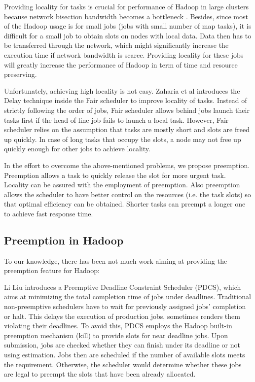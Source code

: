 \documentclass[runningheads,a4paper]{llncs}
\begin{document}
Providing locality for tasks is crucial for performance of Hadoop in large clusters because network bisection bandwidth becomes a bottleneck \cite{dean2008mapreduce}. Besides, since most of the Hadoop usage is for small jobs (jobs with small number of map tasks), it is difficult for a small job to obtain slots on nodes with local data. Data then has to be transferred through the network, which might significantly increase the execution time if network bandwidth is scarce. Providing locality for these jobs will greatly increase the performance of Hadoop in term of time and resource preserving.

Unfortunately, achieving high locality is not easy. Zaharia et al \cite{zaharia2010delay} introduces the Delay technique inside the Fair scheduler to improve locality of tasks. Instead of strictly following the order of jobs, Fair scheduler allows behind jobs launch their tasks first if the head-of-line job fails to launch a local task. However, Fair scheduler relies on the assumption that tasks are mostly short and slots are freed up quickly. In case of long tasks that occupy the slots, a node may not free up quickly enough for other jobs to achieve locality.

In the effort to overcome the above-mentioned problems, we propose preemption. Preemption allows a task to quickly release the slot for more urgent task. Locality can be assured with the employment of preemption. Also preemption allows the scheduler to have better control on the resources (i.e. the task slots) so that optimal efficiency can be obtained. Shorter tasks can preempt a longer one to achieve fast response time.

\subsection*{Preemption in Hadoop}
To our knowledge, there has been not much work aiming at providing the preemption feature for Hadoop:

Li Liu \cite{liu2012preemptive} introduces a Preemptive Deadline Constraint Scheduler (PDCS), which aims at minimizing the total completion time of jobs under deadlines. Traditional non-preemptive schedulers have to wait for previously assigned jobs’ completion or halt. This delays the execution of production jobs, sometimes renders them violating their deadlines. To avoid this, PDCS employs the Hadoop built-in preemption mechanism (kill) to provide slots for near deadline jobs. Upon submission, jobs are checked whether they can finish under its deadline or not using estimation. Jobs then are scheduled if the number of available slots meets the requirement. Otherwise, the scheduler would determine whether these jobs are legal to preempt the slots that have been already allocated.
\end{document}
